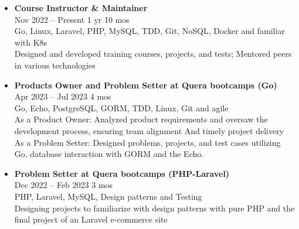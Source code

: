 \documentclass[11pt]{article}
\begin{document}
\begin{itemize}[leftmargin=1cm, itemsep=0.1cm]
    \item \textbf{Course Instructor \& Maintainer} \\
    \textcolor{secondaryColor}{Nov 2022 -- Present \textbullet \hspace{1mm} 1 yr 10 mos} \\
    \textcolor{primaryColor}{\faAward} \hspace{1mm} \textcolor{secondaryColor}{Go, Linux, Laravel, PHP, MySQL, TDD, Git, NoSQL, Docker and familiar with K8s} \\
    \textcolor{primaryColor}{\faTasks} \hspace{1mm} \textcolor{secondaryColor}{Designed and developed training courses, projects, and tests; Mentored peers in various technologies}
    \item \textbf{Products Owner and Problem Setter at Quera bootcamps (Go)} \\
    \textcolor{secondaryColor}{Apr 2023 -- Jul 2023 \textbullet \hspace{1mm} 4 mos} \\
    \textcolor{primaryColor}{\faAward} \hspace{1mm} \textcolor{secondaryColor}{Go, Echo, PostgreSQL, GORM, TDD, Linux, Git and agile} \\
    \textcolor{primaryColor}{\faTasks} \hspace{1mm} \textcolor{secondaryColor}{As a Product Owner: Analyzed product requirements and oversaw the development process, ensuring team alignment And timely project delivery} \\
    \textcolor{primaryColor}{\faTasks} \hspace{1mm} \textcolor{secondaryColor}{As a Problem Setter: Designed problems, projects, and test cases utilizing Go, database interaction with GORM and
    the Echo.}
    \item \textbf{Problem Setter at Quera bootcamps (PHP-Laravel)} \\
    \textcolor{secondaryColor}{Dec 2022 -- Feb 2023 \textbullet \hspace{1mm} 3 mos} \\
    \textcolor{primaryColor}{\faAward} \hspace{1mm} \textcolor{secondaryColor}{PHP, Laravel, MySQL, Design patterns and Testing } \\
    \textcolor{primaryColor}{\faTasks} \hspace{1mm} \textcolor{secondaryColor}{Designing projects to familiarize with design patterns with pure PHP and the final project of an Laravel e-commerce site}
\end{itemize}
\end{document}
